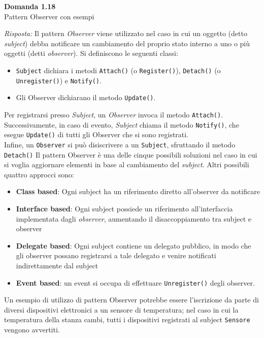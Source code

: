 \documentclass{article}
\newenvironment{problem}[2][Domanda]
    { \begin{mdframed}[backgroundcolor=gray!20] \textbf{#1 #2} \\}
    {  \end{mdframed}}
\newenvironment{solution}
    {\textit{Risposta:}}
    {}
\begin{document}
\begin{problem}{1.18}
Pattern Observer con esempi
\end{problem}
\begin{solution}
Il pattern \textit{Observer} viene utilizzato nel caso in cui un oggetto (detto \textit{subject}) debba notificare un cambiamento del proprio stato interno a uno o più oggetti (detti \textit{observer}).
Si definiscono le seguenti classi:
\begin{itemize}
	\item \texttt{Subject} dichiara i metodi \texttt{Attach()} (o \texttt{Register()}), \texttt{Detach()} (o
	\texttt{Unregister()}) e \texttt{Notify()}.
	\item Gli Observer dichiarano il metodo \texttt{Update()}.
\end{itemize}
Per registrarsi presso \textit{Subject}, un \textit{Observer} invoca il metodo \texttt{Attach()}.
Successivamente, in caso di evento, \textit{Subject} chiama il metodo \texttt{Notify()}, che esegue \texttt{Update()} di tutti gli Observer che si sono registrati.
\\Infine, un \texttt{Observer} si può disiscrivere a un \texttt{Subject}, sfruttando il metodo \texttt{Detach()}
\newline
Il pattern Observer è una delle cinque possibili soluzioni nel caso in cui si voglia aggiornare elementi in base al cambiamento del \textit{subject}.
Altri possibili quattro approcci sono:
\begin{itemize}
	\item \textbf{Class based}: Ogni subject ha un riferimento diretto all'observer da notificare
	\item \textbf{Interface based}: Ogni subject possiede un riferimento all'interfaccia implementata dagli \textit{observer}, aumentando il disaccoppiamento tra subject e observer
	\item \textbf{Delegate based}: Ogni subject contiene un delegato pubblico, in modo che gli observer possano registrarsi a tale delegato e venire notificati indirettamente dal subject
	\item \textbf{Event based}: un event si occupa di effettuare \texttt{Unregister()} degli observer.
\end{itemize}
Un esempio di utilizzo di pattern Observer potrebbe essere l'iscrizione da parte di diversi dispositivi elettronici a un sensore di temperatura; nel caso in cui la temperatura della stanza cambi, tutti i dispositivi registrati al subject \texttt{Sensore} vengono avvertiti.
\newline

\end{solution}
\end{document}
